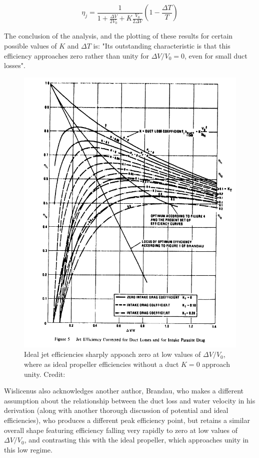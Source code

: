 \documentclass{article}\usepackage[]{graphicx}\usepackage[]{color}
\begin{document}
\begin{equation}
\label{eq:4}
\eta_j = \frac{1}{1 + \frac{\Delta V}{2V_0} + K\frac{V_0}{2 \Delta V}}(1 - \frac{\Delta T}{T})
\end{equation}


The conclusion of the analysis, and the plotting of these results for certain possible values of $K$ and $\Delta T$ is: "Its outstanding characteristic is that this efficiency approaches zero rather than unity for $\Delta V / V_0 = 0$, even for small duct losses".

\begin{figure}
\includegraphics[width=\textwidth]{PumpjetEfficiency.png}
\caption{Ideal jet efficiencies sharply appoach zero at low values of $\Delta V / V_0$, where as ideal propeller efficiencies without a duct $K = 0$ approach unity. Credit: \cite{wislicenus1973}}
\label{fig:PumpjetEfficiency.png}
\end{figure}

Wislicenus also acknowledges \cite{wislicenus1973} another author, Brandau, who makes a different assumption about the relationship between the duct loss and water velocity \parencite{brandau1967} in his derivation (along with another thorough discussion of potential and ideal efficiencies), who produces a different peak efficiency point, but retains a similar overall shape featuring efficiency falling very rapidly to zero at low values of $\Delta V / V_0$, and contrasting this with the ideal propeller, which approaches unity in this low regime.
\end{document}
